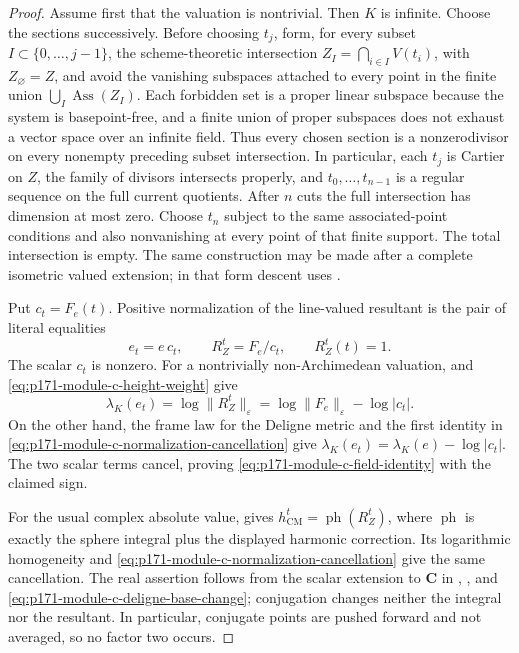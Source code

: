 \begin{proof}
Assume first that the valuation is nontrivial.  Then \(K\) is infinite.
Choose the sections successively.  Before choosing \(t_j\), form, for every
subset \(I\subset\{0,\ldots,j-1\}\), the scheme-theoretic intersection
\(Z_I=\bigcap_{i\in I}V(t_i)\), with \(Z_\varnothing=Z\), and avoid the
vanishing subspaces attached to every point in the finite union
\(\bigcup_I\operatorname{Ass}(Z_I)\).  Each forbidden set is a proper
linear subspace because the system is basepoint-free, and a finite union of
proper subspaces does not exhaust a vector space over an infinite field.
Thus every chosen section is a nonzerodivisor on every nonempty preceding
subset intersection.  In particular, each \(t_j\) is Cartier on \(Z\), the
family of divisors intersects properly, and
\(t_0,\ldots,t_{n-1}\) is a regular sequence on the full current
quotients.  After \(n\) cuts the full intersection has dimension at most
zero.  Choose \(t_n\) subject to the same associated-point conditions and
also nonvanishing at every point of that finite support.  The total
intersection is empty.  The same construction may be made after a complete
isometric valued extension; in that form descent uses
\cite[Proposition~3.8.9 and Remark~3.8.10]{ChenMoriwaki21AdelicIntersection}.

Put \(c_t=F_e(t)\).  Positive normalization of the line-valued resultant
is the pair of literal equalities
\begin{equation}
 e_t=e\,c_t,\qquad R_Z^{t}=F_e/c_t,
 \qquad R_Z^{t}(t)=1.
 \label{eq:p171-module-c-normalization-cancellation}
\end{equation}
The scalar \(c_t\) is nonzero.  For a nontrivially non-Archimedean
valuation, \cite[Theorem~3.8.7]{ChenMoriwaki21AdelicIntersection} and
\eqref{eq:p171-module-c-height-weight} give
\[
 \lambda_K(e_t)=\log\lVert R_Z^{t}\rVert_\varepsilon
 =\log\lVert F_e\rVert_\varepsilon-\log\lvert c_t\rvert.
\]
On the other hand, the frame law for the Deligne metric and the first
identity in \eqref{eq:p171-module-c-normalization-cancellation} give
\(\lambda_K(e_t)=\lambda_K(e)-\log\lvert c_t\rvert\).  The two scalar
terms cancel, proving \eqref{eq:p171-module-c-field-identity} with the
claimed sign.

For the usual complex absolute value,
\cite[Theorem~3.8.7]{ChenMoriwaki21AdelicIntersection} gives
\(h^t_{\mathrm{CM}}=\operatorname{ph}(R_Z^t)\), where
\(\operatorname{ph}\) is exactly the sphere integral plus the displayed
harmonic correction.  Its logarithmic homogeneity and
\eqref{eq:p171-module-c-normalization-cancellation} give the same
cancellation.  The real assertion follows from the scalar extension to
\(\mathbf C\) in \cite[Remark~3.8.10]{ChenMoriwaki21AdelicIntersection},
\cite[Remark~8.1]{BE21}, and
\eqref{eq:p171-module-c-deligne-base-change}; conjugation changes neither
the integral nor the resultant.  In particular, conjugate points are
pushed forward and not averaged, so no factor two occurs.


\end{proof}
